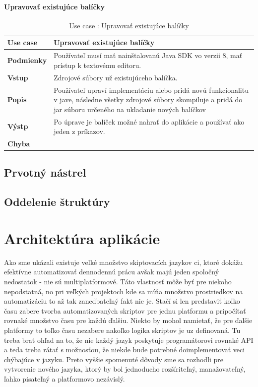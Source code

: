 \paragraph{Upravovať existujúce balíčky}
\begin{center}
	\begin{table}[htbp]
		\begin{tabular}{|p{2.5cm}|p{14cm}|}
			\hline
			\textbf{Use case} & Upravovať existujúce balíčky \\ 
			\hline
			\textbf{Podmienky} &  Používateľ musí mať nainštalovanú Java SDK vo verzii 8, mať prístup k textovému editoru.  \\ 
			\hline
			\textbf{Vstup} & Zdrojové súbory už existujúceho balíčka.\\
			\hline
			\textbf{Popis} & Používateľ upraví implementáciu alebo pridá novú funkcionalitu v jave, následne všetky zdrojové súbory skompiluje a pridá do jar súboru určeného na ukladanie nových balíčkov\\ 
			\hline
			\textbf{Výstp} & Po úprave je balíček možné nahrať do aplikácie a používať ako jeden z príkazov.\\
			\hline
			\textbf{Chyba} & \\
			\hline
		\end{tabular}
		\label{table:1}
		\caption{Use case : Upravovať existujúce balíčky}
	\end{table}
\end{center}

\subsection{Prvotný nástrel}
\subsection{Oddelenie štruktúry}

\section{Architektúra aplikácie}
\indent Ako sme ukázali existuje veľké množstvo skiptovacích jazykov ci, ktoré dokážu efektívne automatizovať dennodennú prácu avšak majú jeden spoločný nedostatok - nie sú multiplatformové. Táto vlastnosť môže byť  pre niekoho nepodstatná, no pri veľkých projektoch kde sa míňa množstvo prostriedkov na automatizáciu to až tak zanedbateľný fakt nie je. Stačí si len predstaviť koľko času zabere tvorba automatizovaných skriptov pre jednu platformu a pripočítať rovnaké množstvo času pre každú ďalšiu. Niekto by mohol namietať, že pre ďalšie platformy to toľko času nezabere nakoľko logika skriptov je uz definovaná. Tu treba brať ohľad na to, že nie každý jazyk poskytuje programátorovi rovnaké API a teda treba rátať s možnosťou, že niekde bude potrebné doimplementovať veci chýbajúce v jazyku. Preto vyššie spomenuté dôvody sme sa rozhodli pre vytvorenie nového jazyka, ktorý by bol jednoducho rozšíriteľný, manažovateľný, ľahko pisateľný a platformovo nezávislý. \cite{morf}

